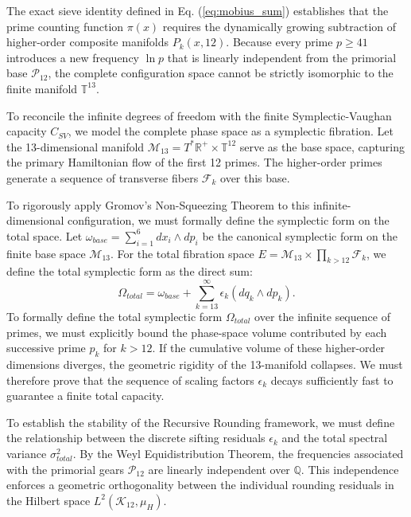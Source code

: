 \documentclass[sn-mathphys-num, pdflatex, referee]{sn-jnl}
\begin{document}
The exact sieve identity defined in Eq. (\ref{eq:mobius_sum}) establishes that the prime counting function $\pi(x)$ requires the dynamically growing subtraction of higher-order composite manifolds $P_k(x,12)$. Because every prime $p \ge 41$ introduces a new frequency $\ln p$ that is linearly independent from the primorial base $\mathcal{P}_{12}$, the complete configuration space cannot be strictly isomorphic to the finite manifold $\mathbb{T}^{13}$. 

To reconcile the infinite degrees of freedom with the finite Symplectic-Vaughan capacity $C_{SV}$, we model the complete phase space as a symplectic fibration. Let the 13-dimensional manifold $\mathcal{M}_{13} = T^*\mathbb{R}^+ \times \mathbb{T}^{12}$ serve as the base space, capturing the primary Hamiltonian flow of the first 12 primes. The higher-order primes generate a sequence of transverse fibers $\mathcal{F}_k$ over this base.

To rigorously apply Gromov's Non-Squeezing Theorem to this infinite-dimensional configuration, we must formally define the symplectic form on the total space. Let $\omega_{base} = \sum_{i=1}^{6} dx_i \wedge dp_i$ be the canonical symplectic form on the finite base space $\mathcal{M}_{13}$. For the total fibration space $E = \mathcal{M}_{13} \times \prod_{k>12} \mathcal{F}_k$, we define the total symplectic form as the direct sum:
\begin{equation}
\Omega_{total} = \omega_{base} + \sum_{k=13}^{\infty} \epsilon_k (dq_k \wedge dp_k).
\end{equation}
To formally define the total symplectic form $\Omega_{total}$ over the infinite sequence of primes, we must explicitly bound the phase-space volume contributed by each successive prime $p_k$ for $k > 12$. If the cumulative volume of these higher-order dimensions diverges, the geometric rigidity of the 13-manifold collapses. We must therefore prove that the sequence of scaling factors $\epsilon_k$ decays sufficiently fast to guarantee a finite total capacity.

To establish the stability of the Recursive Rounding framework, we must define the relationship between the discrete sifting residuals $\epsilon_k$ and the total spectral variance $\sigma_{total}^2$. By the Weyl Equidistribution Theorem, the frequencies associated with the primorial gears $\mathcal{P}_{12}$ are linearly independent over $\mathbb{Q}$. This independence enforces a geometric orthogonality between the individual rounding residuals in the Hilbert space $L^2(\mathcal{K}_{12}, \mu_H)$.
\end{document}
